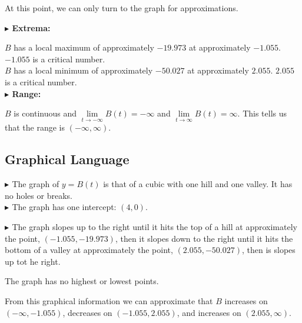 \documentclass{ximera}
\begin{document}
\begin{exercise}
At this point, we can only turn to the graph for approximations.


\textbf{\textcolor{blue!55!black}{$\blacktriangleright$ Extrema: }}  

$B$ has a local maximum of approximately $-19.973$ at approximately $-1.055$.  $-1.055$ is a critical number. \\





$B$ has a local minimum of approximately $-50.027$ at approximately $2.055$.  $2.055$ is a critical number. \\









\textbf{\textcolor{blue!55!black}{$\blacktriangleright$ Range: }}


$B$ is continuous and  $\lim\limits_{t \to -\infty} B(t) = -\infty$  and $\lim\limits_{t \to \infty} B(t) = \infty$.  This tells us that the range is $(-\infty, \infty)$.








\subsection*{Graphical Language}







\textbf{\textcolor{blue!55!black}{$\blacktriangleright$ }}  The graph of $y = B(t)$ is that of a cubic with one hill and one valley. It has no holes or breaks. \\

\textbf{\textcolor{blue!55!black}{$\blacktriangleright$ }}  The graph has one intercept: $(4, 0)$.









\textbf{\textcolor{blue!55!black}{$\blacktriangleright$ }}  The graph slopes up to the right until it hits the top of a hill at approximately the point, $(-1.055, -19.973)$, then it slopes down to the right until it hits the bottom of a valley at approximately the point, $(2.055, -50.027)$, then is slopes up tot he right.



The graph has no highest or lowest points.




From this graphical information we can approximate that $B$ increases on $(-\infty, -1.055)$, decreases on $(-1.055, 2.055)$, and increases on $(2.055, \infty)$.



\end{exercise}
\end{document}
